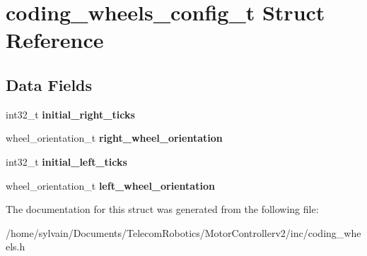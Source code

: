\hypertarget{structcoding__wheels__config__t}{}\section{coding\+\_\+wheels\+\_\+config\+\_\+t Struct Reference}
\label{structcoding__wheels__config__t}
\subsection*{Data Fields}
\begin{DoxyCompactItemize}
\item 
\hypertarget{structcoding__wheels__config__t_a0c1b51e40939ca37f3c4d19a88899113}{}\label{structcoding__wheels__config__t_a0c1b51e40939ca37f3c4d19a88899113} 
int32\+\_\+t {\bfseries initial\+\_\+right\+\_\+ticks}
\item 
\hypertarget{structcoding__wheels__config__t_a2418fceb3c4de392461e6aa51895bf7c}{}\label{structcoding__wheels__config__t_a2418fceb3c4de392461e6aa51895bf7c} 
wheel\+\_\+orientation\+\_\+t {\bfseries right\+\_\+wheel\+\_\+orientation}
\item 
\hypertarget{structcoding__wheels__config__t_ad69d126f4a8af7b893a58a11d3e0a5e6}{}\label{structcoding__wheels__config__t_ad69d126f4a8af7b893a58a11d3e0a5e6} 
int32\+\_\+t {\bfseries initial\+\_\+left\+\_\+ticks}
\item 
\hypertarget{structcoding__wheels__config__t_a5a1915eba7521441ea94fc8620521f70}{}\label{structcoding__wheels__config__t_a5a1915eba7521441ea94fc8620521f70} 
wheel\+\_\+orientation\+\_\+t {\bfseries left\+\_\+wheel\+\_\+orientation}
\end{DoxyCompactItemize}


The documentation for this struct was generated from the following file\+:\begin{DoxyCompactItemize}
\item 
/home/sylvain/\+Documents/\+Telecom\+Robotics/\+Motor\+Controllerv2/inc/coding\+\_\+wheels.\+h\end{DoxyCompactItemize}
